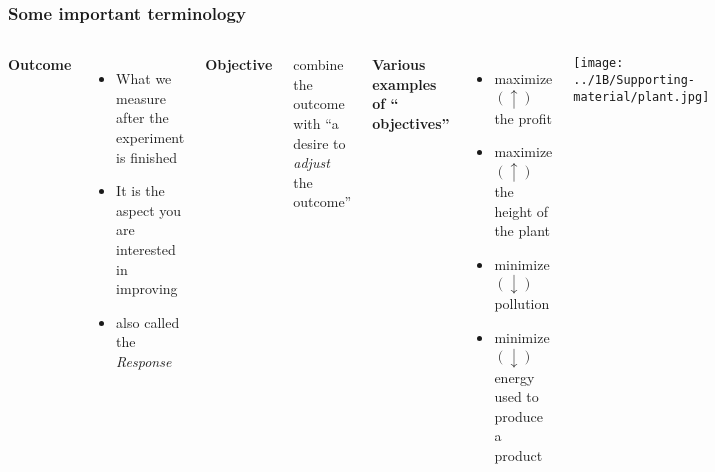 \documentclass[handout,11pt,aspectratio=169,mathserif]{beamer}
\begin{document}
\begin{frame}\frametitle{Some important terminology}

	\begin{columns}[T]
			\textbf{{\color{purple} Outcome}}
				\begin{itemize}
					\item	What we measure after the experiment is finished  \pause
					\item	It is the aspect you are interested in improving  
					\item	also called the \emph{Response}

				\end{itemize}
			
			\pause
			\vspace{12pt}	
			\textbf{{\color{purple} Objective}}
			
				\vspace{1pt}	
				\qquad combine the {\color{purple} outcome} with ``a desire to \emph{adjust} the outcome''
				
				
			\pause
			\vspace{12pt}
			
			{\textbf{{Various examples of ``{\color{purple} objectives}''}}}

				\begin{itemize}
					\item	maximize $(\uparrow)$ the profit
					\item	maximize $(\uparrow)$ the height of the plant
					\item	minimize $(\downarrow)$ pollution
					\item	minimize $(\downarrow)$ energy used to produce a product
				\end{itemize}
			
			
			\centerline{\texttt{[image: ../1B/Supporting-material/plant.jpg]}}
	\end{columns}


\end{frame}
\end{document}
